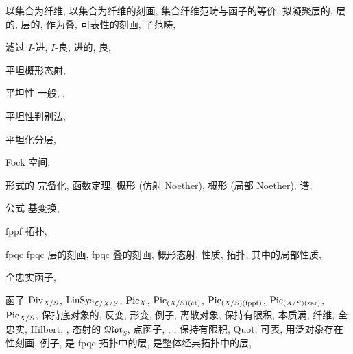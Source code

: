 \begin{theindex}
\subsubitem 以集合为纤维, 
\subsubitem 以集合为纤维的刻画, 
\subsubitem 集合纤维范畴与函子的等价, 
\subsubitem 拟凝聚层的, 
\subsubitem 层的, 
\subsubitem 层的, 作为叠, 
\subsubitem 可表性的刻画, 
\subitem 子范畴, 
\item 滤过
\subitem $I$-进, 
\subitem $I$-良, 
\subitem 进的, 
\subitem 良, 
\item 平坦概形态射, 
\item 平坦性
\subitem 一般, , 
\item 平坦性判别法, 
\item 平坦化分层, 
\item Fock 空间, 
\item 形式的
\subitem 完备化, 
\subitem 函数定理, 
\subitem 概形 (仿射 Noether), 
\subitem 概形 (局部 Noether), 
\subitem 谱, 
\item 公式
\subitem 基变换, 
\item fppf 拓扑, 
\item fpqc
\subitem fpqc 层的刻画, 
\subitem fpqc 叠的刻画, 
\subitem 概形态射, 
\subsubitem 性质, 
\subitem 拓扑, 
\subsubitem 其中的局部性质, 
\item 全忠实函子, 
\item 函子
\subitem $\operatorname{Div}_{X/S}$, 
\subitem $\operatorname{LinSys}_{\mathcal L/X/S}$, 
\subitem $\operatorname{Pic}_X$, 
\subitem $\operatorname{Pic}_{(X/S)(\text{ét})}$, 
\subitem $\operatorname{Pic}_{(X/S)(\mathrm{fppf})}$, 
\subitem $\operatorname{Pic}_{(X/S)(\mathrm{zar})}$, 
\subitem $\operatorname{Pic}_{X/S}$, 
\subitem 保持底对象的, 
\subitem 反变, 
\subitem 形变, 
\subsubitem 例子, 
\subitem 离散对象, 
\subsubitem 保持有限积, 
\subitem 本质满, 
\subitem 纤维, 
\subitem 全忠实, 
\subitem Hilbert, , 
\subitem 态射的 $\mathfrak{Mor}_S$, 
\subitem 点函子, , , 
\subitem 保持有限积, 
\subitem Quot, 
\subitem 可表, 
\subsubitem 用泛对象存在性刻画, 
\subsubitem 例子, 
\subsubitem 是 fpqc 拓扑中的层, 
\subsubitem 是整体经典拓扑中的层, 


\end{theindex}
